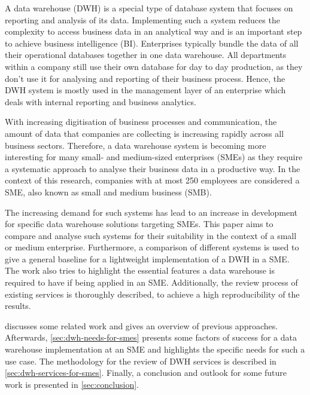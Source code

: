 \documentclass[../paper.tex]{subfiles}
\begin{document}
A data warehouse (DWH) is a special type of database system that focuses on
reporting and analysis of its data. Implementing such a system reduces the
complexity to access business data in an analytical way and is an important
step to achieve business intelligence (BI). Enterprises typically bundle the
data of all their operational databases together in one data warehouse. All
departments within a company still use their own database for day to day
production, as they don't use it for analysing and reporting of their business
process. Hence, the DWH system is mostly used in the management layer of an
enterprise which deals with internal reporting and business analytics.

With increasing digitisation of business processes and communication, the
amount of data that companies are collecting is increasing rapidly across all
business sectors. Therefore, a data warehouse system is becoming more
interesting for many small- and medium-sized enterprises (SMEs) as they require
a systematic approach to analyse their business data in a productive way. In
the context of this research, companies with at most 250 employees are
considered a SME, also known as small and medium business (SMB).

The increasing demand for such systems has lead to an increase in development
for specific data warehouse solutions targeting SMEs. This paper aims to
compare and analyse such systems for their suitability in the context of a
small or medium enterprise. Furthermore, a comparison of different systems is
used to give a general baseline for a lightweight implementation of a DWH in a
SME. The work also tries to highlight the essential features a data warehouse
is required to have if being applied in an SME. Additionally, the review
process of existing services is thoroughly described, to achieve a high
reproducibility of the results.

 discusses some related work and gives an overview of
previous approaches. Afterwards, \cref{sec:dwh-needs-for-smes} presents some
factors of success for a data warehouse implementation at an SME and highlights
the specific needs for such a use case. The methodology for the review of DWH
services is described in \cref{sec:dwh-services-for-smes}. Finally, a
conclusion and outlook for some future work is presented in
\cref{sec:conclusion}.
\end{document}
